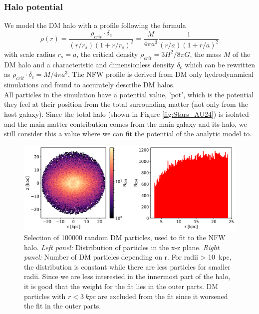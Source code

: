 \subsubsection{Halo potential}\label{subsubsec:halo_pot}
We model the \ac{DM} halo with a  \citep{NFWprofile} profile following the formula 
\begin{equation}
    \rho(r) = \frac{\rho_{crit} \cdot \delta_c}{(r/r_s)(1+r/r_s)^2} = \frac{M}{4 \pi a^3}\frac{1}{(r/a)(1+r/a)^2}
\end{equation} with scale radius $r_s = a$, the critical density $\rho_{crit} = 3H^2 / 8\pi G $, the mass $M$ of the \ac{DM} halo and a characteristic and dimensionless density $\delta_c$ which can be rewritten as \(\rho_{crit}\cdot\delta_c = M/4\pi a^3 \). The \ac{NFW} profile is derived from \ac{DM} only hydrodynamical simulations and found to accurately describe \ac{DM} halos. 
\\All particles in the simulation have a potential value, 'pot',  which is the potential they feel at their position from the total surrounding matter (not only from the host galaxy). Since the total halo (shown in Figure \ref{fig:Stars_AU24}) is isolated and the main matter contribution comes from the main galaxy and its halo, we still consider this a value where we can fit the potential of the analytic model to. 
\begin{figure}[htbp]
\captionsetup{format=plain}
    \centering
    \includegraphics[width=\textwidth]{plots/Auriga/DM_selected_part_dist_snap_127.png}
    \caption{Selection of 100000 random \ac{DM} particles, used to fit to the \ac{NFW} halo. \textit{Left panel:} Distribution of particles in the x-z plane. \textit{Right panel:} Number of \ac{DM} particles depending on r. For radii > \SI{10}{kpc}, the distribution is constant while there are less particles for smaller radii. Since we are less interested in the innermost part of the halo, it is good that the weight for the fit lies in the outer parts. \ac{DM} particles with $r < \SI{3}{kpc}$ are excluded from the fit since it worsened the fit in the outer parts.}
    \label{fig:DM_part_selection}
\end{figure}
